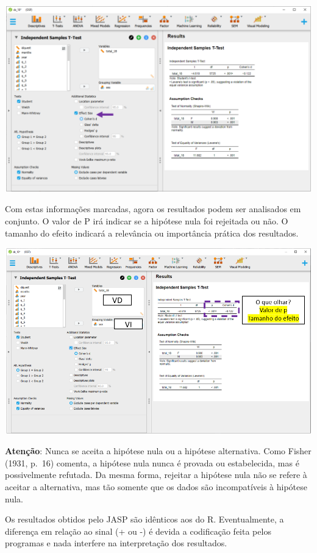 \documentclass[
]{book}
\begin{document}
\includegraphics{./img/cap_testet_tamanho_do_efeito.png}

Com estas informações marcadas, agora os resultados podem ser analisados
em conjunto. O valor de P irá indicar se a hipótese nula foi rejeitada
ou não. O tamanho do efeito indicará a relevância ou importância prática
dos resultados.

\includegraphics{./img/cap_testet_resultados.png}

\begin{warning}

\textbf{Atenção}: Nunca se aceita a hipótese nula ou a hipótese
alternativa. Como Fisher (1931, p.~16) comenta, a hipótese nula nunca é
provada ou estabelecida, mas é possivelmente refutada. Da mesma forma,
rejeitar a hipótese nula não se refere à aceitar a alternativa, mas tão
somente que os dados são incompatíveis à hipótese nula.

\end{warning}

Os resultados obtidos pelo JASP são idênticos aos do R. Eventualmente, a
diferença em relação ao sinal (+ ou -) é devida a codificação feita
pelos programas e nada interfere na interpretação dos resultados.
\end{document}
